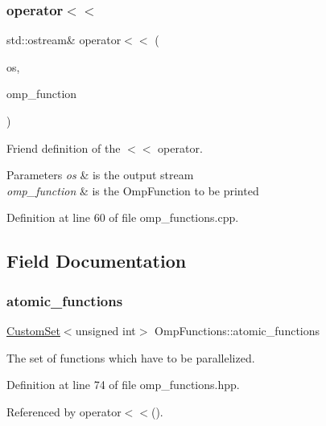 \subsubsection{\texorpdfstring{operator$<$$<$}{operator<<}}
{\footnotesize\ttfamily std\+::ostream\& operator$<$$<$ (\begin{DoxyParamCaption}\item[{std\+::ostream \&}]{os,  }\item[{const \hyperlink{classOmpFunctions}{Omp\+Functions} $\ast$}]{omp\+\_\+function }\end{DoxyParamCaption})\hspace{0.3cm}{\ttfamily [friend]}}



Friend definition of the $<$$<$ operator. 


\begin{DoxyParams}{Parameters}
{\em os} & is the output stream \\
\hline
{\em omp\+\_\+function} & is the Omp\+Function to be printed \\
\hline
\end{DoxyParams}


Definition at line 60 of file omp\+\_\+functions.\+cpp.



\subsection{Field Documentation}
\mbox{\label{classOmpFunctions_a05d19f13553c5517c1ae274cf5c844dd}} 
\subsubsection{\texorpdfstring{atomic\+\_\+functions}{atomic\_functions}}
{\footnotesize\ttfamily \hyperlink{custom__set_8hpp_a615bc2f42fc38a4bb1790d12c759e86f}{Custom\+Set}$<$unsigned int$>$ Omp\+Functions\+::atomic\+\_\+functions}



The set of functions which have to be parallelized. 



Definition at line 74 of file omp\+\_\+functions.\+hpp.



Referenced by operator$<$$<$().


